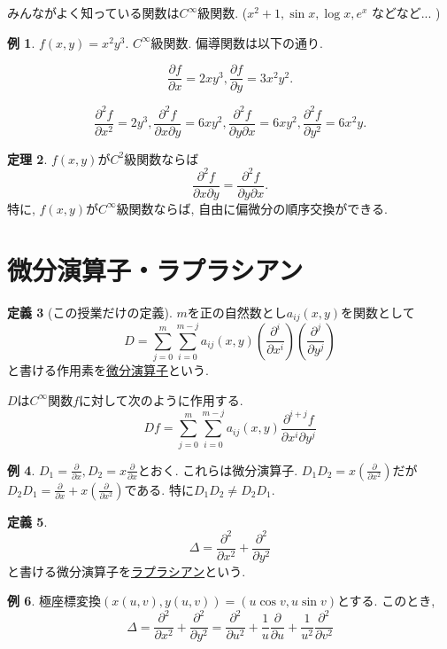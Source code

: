 \documentclass[dvipdfmx,a4paper,11pt]{article}
\theoremstyle{definition}
\newtheorem{thm}{定理}
\newtheorem{dfn}[thm]{定義}
\newtheorem{exa}[thm]{例}
\newcommand{\pdrv}[2]{\frac{\partial #1}{\partial #2}}
\newcommand{\ppdrv}[3]{\frac{\partial^2 #1}{\partial #2 \partial #3}}
\begin{document}
みんながよく知っている関数は$C^{\infty}$級関数.
($x^2+1, \sin x, \log x, e^x$ などなど... )
\begin{exa}
$f(x,y) = x^2 y^3$. $C^{\infty}$級関数. 偏導関数は以下の通り.

$$
\pdrv{f}{x}=2xy^3,  \pdrv{f}{y}=3x^2y^2.
$$

$$
\pdrv{^2f}{x^2} = 2y^3, 
\ppdrv{f}{x}{y} =6xy^2, 
\ppdrv{f}{y}{x} =6xy^2, 
\pdrv{^2f}{y^2} = 6x^2y.
$$
\end{exa}

\begin{tcolorbox}[
    colback = white,
    colframe = green!35!black,
    fonttitle = \bfseries,
    breakable = true]
    \begin{thm}
$f(x,y)$が$C^2$級関数ならば
$$
\ppdrv{f}{x}{y} =\ppdrv{f}{y}{x}.
$$
特に, $f(x,y)$が$C^\infty$級関数ならば, 自由に偏微分の順序交換ができる.
    \end{thm}
    \end{tcolorbox}

\section{微分演算子・ラプラシアン}

\begin{tcolorbox}[
    colback = white,
    colframe = green!35!black,
    fonttitle = \bfseries,
    breakable = true]
    \begin{dfn}[この授業だけの定義]
$m$を正の自然数とし$a_{ij}(x,y)$を関数として
$$
D = \sum_{j=0}^{m} \sum_{i=0}^{m-j} a_{ij}(x,y) \left( \pdrv{^i}{x^i} \right)\left( \pdrv{^j}{y^{j}} \right)
$$ 
と書ける作用素を\underline{微分演算子}という.

$D$は$C^{\infty}$関数$f$に対して次のように作用する.
$$
Df = \sum_{j=0}^{m} \sum_{i=0}^{m-j} a_{ij}(x,y) {\frac{\partial^{i+j} f}{\partial x^i \partial y^{j}}}
$$
    \end{dfn}
    \end{tcolorbox}
    
 \begin{exa}
 $D_1=\pdrv{}{x}, D_2=x\pdrv{}{x}$とおく. これらは微分演算子.
 $D_1D_2 = x\left( \pdrv{}{x^2} \right)$だが
  $D_2D_1 =\pdrv{}{x} + x\left( \pdrv{}{x^2} \right)$である.
  特に$D_1D_2 \neq D_2D_1$.
 \end{exa}
 
 \begin{tcolorbox}[
    colback = white,
    colframe = green!35!black,
    fonttitle = \bfseries,
    breakable = true]
    \begin{dfn}
$$
\Delta = \pdrv{^2}{x^2} + \pdrv{^2}{y^2}
$$
と書ける微分演算子を\underline{ラプラシアン}という.
    \end{dfn}
    \end{tcolorbox}

    
 \begin{exa}
極座標変換$(x(u,v), y(u,v))  = (u \cos v, u \sin v)$とする.
このとき, 
$$
\Delta = \pdrv{^2}{x^2} + \pdrv{^2}{y^2} 
= \pdrv{^2}{u^2} + \frac{1}{u}\pdrv{}{u}  +  \frac{1}{u^2}\pdrv{^2}{v^2} 
$$
 \end{exa}
 
\end{document}
